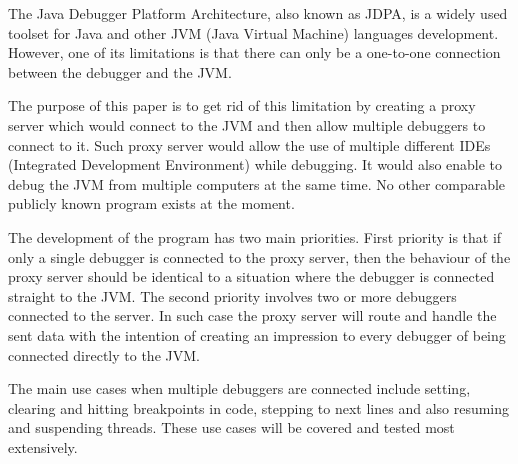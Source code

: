 \documentclass[..thesis.tex]{subfiles}
\begin{document}

The Java Debugger Platform Architecture, also known as JDPA, is a widely used toolset for Java and other JVM (Java Virtual Machine) languages development.
However, one of its limitations is that there can only be a one-to-one connection between the debugger and the JVM.


The purpose of this paper is to get rid of this limitation by creating a proxy server which would connect to the JVM and then allow multiple debuggers to connect to it. 
Such proxy server would allow the use of multiple different IDEs (Integrated Development Environment) while debugging. It would also enable to debug the JVM from multiple computers at the same time. 
No other comparable publicly known program exists at the moment.


The development of the program has two main priorities. 
First priority is that if only a single debugger is connected to the proxy server, then the behaviour of the proxy server should be identical to a situation where the debugger is connected straight to the JVM.
The second priority involves two or more debuggers connected to the server. In such case the proxy server will route and handle the sent data with the intention of creating an impression to every debugger of being connected directly to the JVM.

The main use cases when multiple debuggers are connected include setting, clearing and hitting breakpoints in code, stepping to next lines and also resuming and suspending threads.
These use cases will be covered and tested most extensively.
\end{document}
